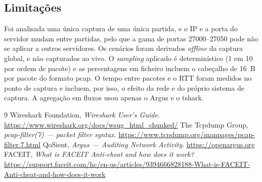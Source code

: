 \documentclass[10.5pt,a4paper]{article}
\begin{document}
\subsection{Limitações}
Foi analisada uma única captura de uma única partida, e o IP e a porta do servidor mudam entre
partidas, pelo que a gama de portas 27000--27050 pode não se aplicar a outros servidores. Os
cenários foram derivados \emph{offline} da captura global, e não capturados ao vivo. O
\emph{sampling} aplicado é determinístico (1 em 10 por ordem de pacote) e as percentagens em
ficheiro incluem o cabeçalho de 16~B por pacote do formato pcap. O tempo entre pacotes e o RTT
foram medidos no ponto de captura e incluem, por isso, o efeito da rede e do próprio sistema de
captura. A agregação em fluxos usou apenas o Argus e o tshark.

\begin{thebibliography}{9}\small
{} Wireshark Foundation, \emph{Wireshark User's Guide}.
  \url{https://www.wireshark.org/docs/wsug_html_chunked/}
 The Tcpdump Group, \emph{pcap-filter(7) --- packet filter syntax}.
  \url{https://www.tcpdump.org/manpages/pcap-filter.7.html}
 QoSient, \emph{Argus --- Auditing Network Activity}. \url{https://openargus.org}
 FACEIT, \emph{What is FACEIT Anti-cheat and how does it work?}
  \url{https://support.faceit.com/hc/en-us/articles/9394666828188-What-is-FACEIT-Anti-cheat-and-how-does-it-work}
\end{thebibliography}

\appendix
\end{document}
